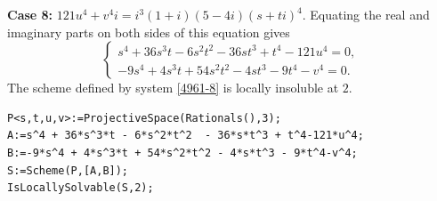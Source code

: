 \documentclass[a4paper,12pt,english,reqno]{amsart}
\begin{document}
{\bf Case 8:} $121u^4+v^4i=i^3(1+i)(5- 4i)(s+ti)^4$.  Equating the real and imaginary parts on both sides of this equation gives
\begin{equation}\label{4961-8}
\begin{cases}
s^4 + 36s^3t - 6s^2t^2 - 36st^3 + t^4 - 121u^4=0,\\
-9s^4 + 4s^3t + 54s^2t^2 - 4st^3 - 9t^4 - v^4=0.
\end{cases}
\end{equation}
The scheme defined by system \eqref{4961-8} is locally insoluble at $2$.

%
\begin{lstlisting}
P<s,t,u,v>:=ProjectiveSpace(Rationals(),3);
A:=s^4 + 36*s^3*t - 6*s^2*t^2  - 36*s*t^3 + t^4-121*u^4;
B:=-9*s^4 + 4*s^3*t + 54*s^2*t^2 - 4*s*t^3 - 9*t^4-v^4;
S:=Scheme(P,[A,B]);
IsLocallySolvable(S,2);
\end{lstlisting}
\end{document}
